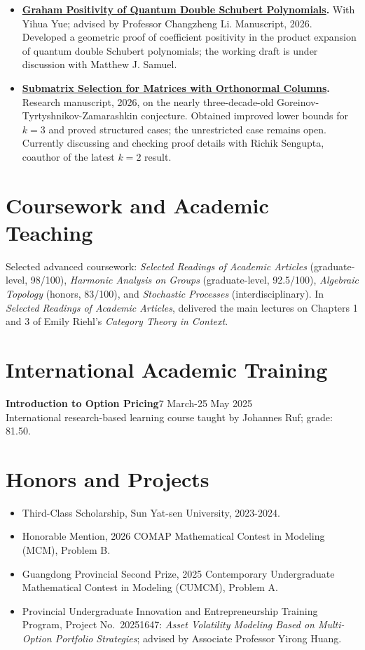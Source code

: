 \documentclass[10pt,a4paper]{article}
\newcommand{\entry}[2]{\textbf{#1}\hfill #2\\[-0.5pt]}
\begin{document}
\begin{itemize}
  \item \textbf{\href{https://xtr1976536.github.io/files/papers/algebraic-geometry/Graham_Positivity_Quantum_Double_Schubert_Polynomials.pdf}{Graham Positivity of Quantum Double Schubert Polynomials}.} With Yihua Yue; advised by Professor Changzheng Li. Manuscript, 2026. Developed a geometric proof of coefficient positivity in the product expansion of quantum double Schubert polynomials; the working draft is under discussion with Matthew J. Samuel.

  \item \textbf{\href{https://xtr1976536.github.io/publication/2026-three-frame-conjecture/}{Submatrix Selection for Matrices with Orthonormal Columns}.} Research manuscript, 2026, on the nearly three-decade-old Goreinov-Tyrtyshnikov-Zamarashkin conjecture. Obtained improved lower bounds for $k=3$ and proved structured cases; the unrestricted case remains open. Currently discussing and checking proof details with Richik Sengupta, coauthor of the latest $k=2$ result.
\end{itemize}

\section*{Coursework and Academic Teaching}
Selected advanced coursework: \textit{Selected Readings of Academic Articles} (graduate-level, 98/100), \textit{Harmonic Analysis on Groups} (graduate-level, 92.5/100), \textit{Algebraic Topology} (honors, 83/100), and \textit{Stochastic Processes} (interdisciplinary). In \textit{Selected Readings of Academic Articles}, delivered the main lectures on Chapters 1 and 3 of Emily Riehl's \textit{Category Theory in Context}.

\section*{International Academic Training}
\entry{Introduction to Option Pricing}{7 March-25 May 2025}
International research-based learning course taught by Johannes Ruf; grade: 81.50.

\section*{Honors and Projects}
\begin{itemize}
  \item Third-Class Scholarship, Sun Yat-sen University, 2023-2024.
  \item Honorable Mention, 2026 COMAP Mathematical Contest in Modeling (MCM), Problem B.
  \item Guangdong Provincial Second Prize, 2025 Contemporary Undergraduate Mathematical Contest in Modeling (CUMCM), Problem A.
  \item Provincial Undergraduate Innovation and Entrepreneurship Training Program, Project No.~20251647: \textit{Asset Volatility Modeling Based on Multi-Option Portfolio Strategies}; advised by Associate Professor Yirong Huang.
\end{itemize}
\end{document}
